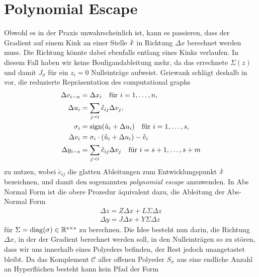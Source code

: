 \section{Polynomial Escape}
Obwohl es in der Praxis unwahrscheinlich ist, kann es passieren, dass der Gradient auf einem Kink an einer Stelle $\mathring{x}$ in Richtung $\Delta x$ berechnet werden muss. Die Richtung könnte dabei ebenfalls entlang eines Kinks verlaufen.
In diesem Fall haben wir keine Bouligandableitung mehr, da das errechnete $\Sigma(z)$ und damit $J_\sigma$ für ein $z_i=0$ Nulleinträge aufweist. Griewank schlägt deshalb in \cite[S.29]{monster} vor, die reduzierte Repräsentation des computational graphs 
\begin{equation}
 \begin{aligned}
  \Delta v_{i-n} &= \Delta x_i \quad \text{für } i=1,\ldots,n, \\
  \Delta u_i &= \sum_{j\prec i} \mathring c_{ij}\Delta v_j,\\
  \sigma_i& = \text{sign}(\mathring u_i + \Delta u_i) \quad \text{für } i=1,\ldots,s,\\
  \Delta v_i &= \sigma_i \cdot (\mathring u_i+\Delta u_i) - \mathring{v}_i\\
  \Delta y_{i-s}& = \sum_{j\prec i} \mathring c_{ij} \Delta v_j \quad \text{für } i=s+1, \ldots, s+m
 \end{aligned}
 \label{eq:minComputationalGraphRepr}
\end{equation}
zu nutzen, wobei $\mathring c_{ij}$ die glatten Ableitungen zum Entwicklungspunkt $\mathring{x}$ bezeichnen, und damit den sogenannten \textit{polynomial escape} anzuwenden. In Abs Normal Form ist die obere Prozedur äquivalent dazu, die Ableitung der Abs-Normal Form 
\begin{equation}
\begin{aligned}
  \Delta z = Z\Delta x + L\Sigma \Delta z \\
 \Delta y = J\Delta x + Y\Sigma \Delta z  
\end{aligned}
\label{eq:jacAbsNormalForm}
\end{equation}
für $\Sigma = \operatorname{diag}(\sigma) \in \mathbb{R}^{s\times s}$ zu berechnen. Die Idee besteht nun darin, die Richtung $\Delta x$, in der der Gradient berechnet werden soll, in den Nulleinträgen so zu stören, dass wir uns innerhalb eines Polyeders befinden, der Rest jedoch unangetastet bleibt. Da das Komplement $\mathcal C$ aller offenen Polyeder $S_\sigma$ aus eine endliche Anzahl an Hyperflächen  besteht kann kein Pfad der Form
